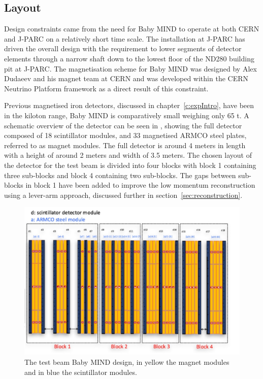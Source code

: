 \subsection{Layout}
Design constraints came from the need for Baby MIND to operate at both CERN and J-PARC on a relatively short time scale. The installation at J-PARC has driven the overall design with the requirement to lower segments of detector elements through a narrow shaft down to the lowest floor of the ND280 building pit at J-PARC. The magnetisation scheme for Baby MIND was designed by Alex Dudaeev and his magnet team at CERN and was developed within the CERN Neutrino Platform framework as a direct result of this constraint.

Previous magnetised iron detectors, discussed in chapter~\ref{c:expIntro}, have been in the kiloton range, Baby MIND is comparatively small weighing only 65 t. A schematic overview of the detector can be seen in , showing the full detector composed of 18 scintillator modules, and 33 magnetised ARMCO steel plates, referred to as magnet modules. The full detector is around 4 meters in length with a height of around 2 meters and width of 3.5 meters. The chosen layout of the detector for the test beam is divided into four blocks with block 1 containing three sub-blocks and block 4 containing two sub-blocks. The gaps between sub-blocks in block 1 have been added to improve the low momentum reconstruction using a lever-arm approach, discussed further in section~\ref{sec:reconstruction}.



\begin{figure}[h!]
\centering
\includegraphics[width=\textwidth]{figures/MIND.jpeg}
\caption{The test beam Baby MIND design, in yellow the magnet modules and in blue the scintillator modules.}
\label{fig:design}
\end{figure}

